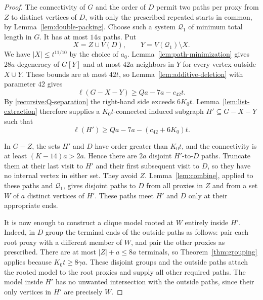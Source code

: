 \begin{proof}
The connectivity of $G$ and the order of $D$ permit two paths per proxy
from $Z$ to distinct vertices of $D$, with only the prescribed repeated
starts in common, by Lemma~\ref{lem:double-packing}. Choose such a system
$\mathcal Q_1$ of minimum total length in $G$. It has at most $14a$ paths.
Put
\[
 X=Z\cup V(D),\qquad Y=V(\mathcal Q_1)\setminus X.
\]
We have $|X|\le t^{11/10}$ by the choice of $a_0$.
Lemma~\ref{lem:path-minimization} gives $28a$-degeneracy of $G[Y]$ and
at most $42a$ neighbors in $Y$ for every vertex outside $X\cup Y$.
These bounds are at most $42t$, so Lemma~\ref{lem:additive-deletion}
with parameter $42$ gives
\begin{equation}\label{recursive:after-paths}
 \ell(G-X-Y)\ge Qa-7a-c_{42}t.
\end{equation}
By \eqref{recursive:Q-separation} the right-hand side exceeds $6K_0t$.
Lemma~\ref{lem:list-extraction} therefore supplies a $K_0t$-connected
induced subgraph $H'\subseteq G-X-Y$ such that
\begin{equation}\label{recursive:Hprime}
 \ell(H')\ge Qa-7a-(c_{42}+6K_0)t.
\end{equation}

In $G-Z$, the sets $H'$ and $D$ have order greater than $K_0t$, and the
connectivity is at least $(K-14)a>2a$. Hence there are $2a$ disjoint
$H'$-to-$D$ paths. Truncate them at their last visit to $H'$ and their
first subsequent visit to $D$, so they have no internal vertex in either
set. They avoid $Z$. Lemma~\ref{lem:combine}, applied to these paths and
$\mathcal Q_1$, gives disjoint paths to $D$ from all proxies in $Z$ and
from a set $W$ of $a$ distinct vertices of $H'$. These paths meet $H'$ and
$D$ only at their appropriate ends.

It is now enough to construct a clique model rooted at $W$ entirely
inside $H'$. Indeed, in $D$ group the terminal ends of the outside paths
as follows: pair each root proxy with a different member of $W$, and
pair the other proxies as prescribed. There are at most $|Z|+a\le8a$
terminals, so Theorem~\ref{thm:grouping} applies because
$K_0t\ge8\gamma a$. These disjoint groups and the outside paths attach
the rooted model to the root proxies and supply all other required
paths. The model inside $H'$ has no unwanted intersection with the
outside paths, since their only vertices in $H'$ are precisely $W$.


\end{proof}
